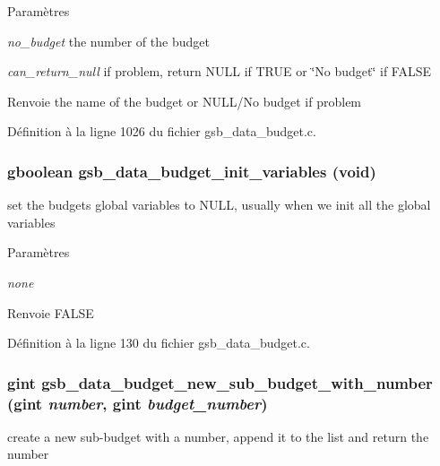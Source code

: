 \begin{DoxyParams}{Paramètres}
\item[{\em no\_\-budget}]the number of the budget \item[{\em can\_\-return\_\-null}]if problem, return NULL if TRUE or \char`\"{}No budget\char`\"{} if FALSE\end{DoxyParams}
\begin{DoxyReturn}{Renvoie}
the name of the budget or NULL/No budget if problem 
\end{DoxyReturn}


Définition à la ligne 1026 du fichier gsb\_\-data\_\-budget.c.

\subsubsection[{gsb\_\-data\_\-budget\_\-init\_\-variables}]{\setlength{\rightskip}{0pt plus 5cm}gboolean gsb\_\-data\_\-budget\_\-init\_\-variables (void)}\label{gsb__data__budget_8h_ac0fa7f6b2e330b65a497ec9a17f757ba}
set the budgets global variables to NULL, usually when we init all the global variables


\begin{DoxyParams}{Paramètres}
\item[{\em none}]\end{DoxyParams}
\begin{DoxyReturn}{Renvoie}
FALSE 
\end{DoxyReturn}


Définition à la ligne 130 du fichier gsb\_\-data\_\-budget.c.

\subsubsection[{gsb\_\-data\_\-budget\_\-new\_\-sub\_\-budget\_\-with\_\-number}]{\setlength{\rightskip}{0pt plus 5cm}gint gsb\_\-data\_\-budget\_\-new\_\-sub\_\-budget\_\-with\_\-number (gint {\em number}, \/  gint {\em budget\_\-number})}\label{gsb__data__budget_8h_a6320ffd3c5561de179640c85404dc87d}
create a new sub-\/budget with a number, append it to the list and return the number


